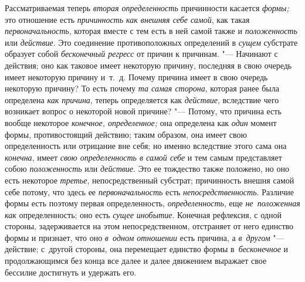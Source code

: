 Рассматриваемая теперь {\em вторая определенность} причинности касается
{\em формы;} это отношение есть {\em причинность как внешняя себе самой}, как
такая {\em первоначальность}, которая вместе с тем есть в ней самой также и
{\em положенность} или {\em действие}. Это соединение противоположных
определений в {\em сущем} субстрате образует собой {\em бесконечный регресс} от
причин к причинам. "--- Начинают с действия; оно как таковое имеет некоторую
причину, последняя в свою очередь имеет некоторую причину и~т.~д. Почему
причина имеет в свою очередь некоторую причину? То есть почему
{\em та самая сторона}, которая ранее была определена {\em как причина}, теперь
определяется как {\em действие}, вследствие чего возникает вопрос о некоторой
новой причине? "--- Потому, что причина есть вообще некоторое
{\em конечное, определенное;} она определена как {\em один} момент формы,
противостоящий действию; таким образом, она имеет свою определенность или
отрицание вне себя; но именно вследствие этого сама она {\em конечна}, имеет
{\em свою определенность в самой себе} и тем самым представляет собою
{\em положенность} или {\em действие}. Это ее тождество также положено, но оно
есть некоторое {\em третье}, непосредственный субстрат; причинность внешня
самой себе потому, что здесь ее {\em первоначальность} есть
{\em непосредственность}. Различие формы есть поэтому первая определенность,
{\em определенность}, еще {\em не~положенная как} определенность; оно есть
{\em сущее инобытие}. Конечная рефлексия, с одной стороны, задерживается на
этом непосредственном, отстраняет от него единство формы и признает, что оно
{\em в~одном отношении} есть причина, а {\em в~другом} "--- действие;
с~другой стороны, она перемещает единство формы в~{\em бесконечное}
и продолжающимся без конца все далее и далее движением
выражает свое бессилие достигнуть и удержать его.

